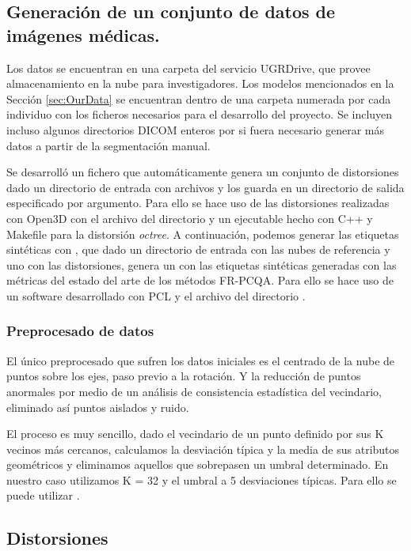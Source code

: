 \subsection*{Generación de un conjunto de datos de imágenes médicas.}
Los datos se encuentran en una carpeta del servicio UGRDrive, que provee almacenamiento 
en la nube para investigadores. Los modelos mencionados en la Sección \ref{sec:OurData} 
se encuentran dentro de una carpeta numerada por cada individuo con los ficheros 
necesarios para el desarrollo del proyecto. Se incluyen incluso algunos directorios 
DICOM enteros por si fuera necesario generar más datos a partir de la segmentación 
manual. 

Se desarrolló un fichero  que automáticamente genera 
un conjunto de distorsiones dado un directorio de entrada con archivos  y los 
guarda en un directorio de salida especificado por argumento. Para ello se hace 
uso de las distorsiones realizadas con Open3D\cite{Open3D} 
con el archivo del directorio  y un ejecutable hecho 
con C++ y Makefile para la distorsión \emph{octree}. A continuación, 
podemos generar las etiquetas sintéticas con , que dado un 
directorio de entrada con las nubes de referencia y uno con las distorsiones, 
genera un  con las etiquetas sintéticas generadas con las métricas 
del estado del arte de los métodos FR-PCQA. Para ello se hace uso de un 
software desarrollado con PCL\cite{PCL} y el archivo del directorio . 

\subsubsection*{Preprocesado de datos}
El único preprocesado que sufren los datos iniciales es el centrado de la nube 
de puntos sobre los ejes, paso previo a la rotación. Y la reducción de puntos 
anormales por medio de un análisis de consistencia estadística del vecindario,
eliminado así puntos aislados y ruido. 

El proceso es muy sencillo, dado el vecindario de un punto definido por sus 
K vecinos más cercanos, calculamos la desviación típica y la media de sus atributos 
geométricos y eliminamos aquellos que sobrepasen un umbral determinado. 
En nuestro caso utilizamos K = 32 y el umbral a 5 desviaciones típicas. Para 
ello se puede utilizar .

\subsection*{Distorsiones}
\label{sec:DatosSinteticos}
